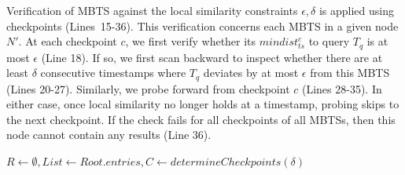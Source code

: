 Verification of MBTS against the local similarity constraints $\epsilon, \delta$ is applied using checkpoints (Lines~15-36). This verification concerns each MBTS in a given node $N'$. At each checkpoint $c$, we first verify whether its $mindist_{ts}^c$ to query $T_q$ is at most $\epsilon$ (Line 18). If so, we first scan backward to inspect whether there are at least $\delta$ consecutive timestamps where $T_q$ deviates by at most $\epsilon$ from this MBTS (Lines 20-27). Similarly, we probe forward from checkpoint $c$ (Lines 28-35). In either case, once local similarity no longer holds at a timestamp, probing skips to the next checkpoint. If the check fails for all checkpoints of all MBTSs, then this node cannot contain any results (Line 36).

\begin{algorithm}[!t]
    \DontPrintSemicolon
    \begin{footnotesize}
    \vspace{4pt}
    $R \leftarrow \emptyset, List \leftarrow Root.entries, C \leftarrow determineCheckpoints(\delta)$ \\
    

\end{footnotesize}
\end{algorithm}
